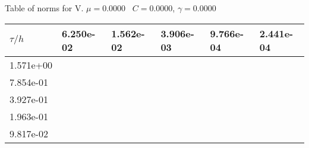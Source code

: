 \begin{center}
Table of norms for V. $\mu = 0.0000$ \, $C = 0.0000$, $\gamma = 0.0000$
  
\begin{tabular}{|p{1in}|p{1in}|p{1in}|p{1in}|p{1in}|p{1in}|} \hline
$\tau / h$ &6.250e-02 &1.562e-02 &3.906e-03 &9.766e-04 &2.441e-04 \\ \hline 
1.571e+00 & & & & & \\ \hline 
7.854e-01 & & & & & \\ \hline 
3.927e-01 & & & & & \\ \hline 
1.963e-01 & & & & & \\ \hline 
9.817e-02 & & & & & \\ \hline 

\end{tabular}\\[20pt]
\end{center}
